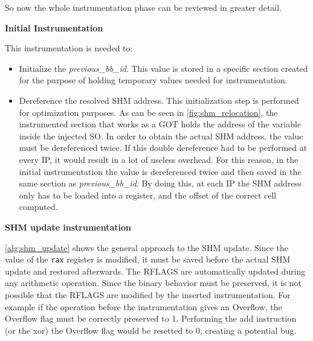 So now the whole instrumentation phase can be reviewed in greater detail.
\begin{center}
    \textbf{Initial Instrumentation}
\end{center}
This instrumentation is needed to:
\begin{itemize}
    \item Initialize the \textit{previous\_bb\_id}. This value is stored in a specific section created for the purpose of 
        holding temporary values needed for instrumentation.
    \item Dereference the resolved \gls{SHM} address. This initialization step is performed for optimization purposes. 
        As can be seen in \cref{fig:shm_relocation}, the instrumented section that works as a \gls{GOT} holds the address 
        of the variable inside the injected \gls{SO}. In order to obtain the actual \gls{SHM} address, the value must be dereferenced twice. 
        If this double dereference had to be performed at every \gls{IP}, it would result in a lot of useless overhead.
        For this reason, in the initial instrumentation the value is dereferenced twice and then saved in the same section as \textit{previous\_bb\_id}.
        By doing this, at each \gls{IP} the \gls{SHM} address only has to be loaded into a register, and the offset of the correct cell computed.
\end{itemize}
\begin{center}
    \textbf{\gls{SHM} update instrumentation}
\end{center}
\cref{alg:shm_update} shows the general approach to the \gls{SHM} update.
Since the value of the \texttt{rax} register is modified, it must be saved before the actual \gls{SHM} update and restored afterwards.
The RFLAGS are automatically updated during any arithmetic operation.
Since the binary behavior must be preserved, it is not possible that the RFLAGS are modified by the inserted instrumentation.
For example if the operation before the instrumentation gives an Overflow, the Overflow flag must be correctly preserved to 1.
Performing the add instruction (or the xor) the Overflow flag would be resetted to 0, creating a potential bug.
